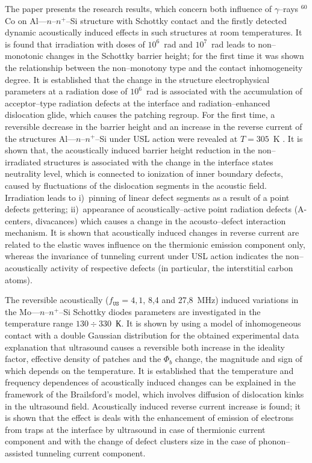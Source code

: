 The paper presents the research results, which concern both influence of $\gamma$--rays $^{60}$Co on Al---$n$--$n^+$--Si structure with Schottky contact and
the firstly detected dynamic acoustically induced effects in such structures at room temperatures.
It is found that irradiation with doses of $10^6$~rad and $10^7$~rad leads to
non--monotonic changes in the Schottky barrier height;
for the first time it was shown the relationship between the non--monotony type and the contact inhomogeneity degree.
It is established that the change in the structure electrophysical parameters  at a radiation dose of $10^6$~rad
 is associated with the accumulation of acceptor--type radiation defects at the interface and
 radiation--enhanced dislocation glide, which causes the patching regroup.
For the first time, a reversible decrease in the barrier height and an increase in the reverse current of the structures Al---$n$--$n^+$--Si under USL action were revealed at $T=305$~K .
It is shown that, the acoustically induced barrier height reduction in the non--irradiated structures is associated with the change in the interface states neutrality level, which is connected to ionization of inner boundary defects, caused by fluctuations of the dislocation segments in the acoustic field.
Irradiation leads to
i)~pinning of linear defect segments as a result of a point defects gettering;
ii)~appearance of acoustically--active point radiation defects (A-centers, divacances)
which causes a change in the acousto--defect interaction mechanism.
It is shown that acoustically induced changes in reverse current are related to the elastic waves influence on the thermionic emission component only,
whereas the invariance of tunneling current under USL action indicates the  non--acoustically activity of respective
defects (in particular, the interstitial carbon atoms).


The reversible acoustically ($f_\mathtt{US}=4,1$, 8,4 and 27,8~MHz)
induced variations in the Mo---$n$--$n^+$--Si Schottky diodes parameters are investigated in the temperature range $130\div330$~К.
It is shown by using a model of inhomogeneous contact with a double Gaussian distribution for the obtained experimental data explanation that ultrasound causes a reversible both increase in the ideality factor,  effective density of patches and the $\Phi_{b}$ change,
the magnitude and sign of which depends on the temperature.
It is established that the temperature and frequency dependences of acoustically induced changes can be explained in the framework of the Brailsford’s model,
which involves diffusion of dislocation kinks in the ultrasound field.
Acoustically induced reverse current increase is found;
it is shown that the effect is deals with the enhancement of emission of electrons from traps at the interface by ultrasound in case of thermionic current component
and with the change of defect clusters size in the case of phonon--assisted tunneling current component.


